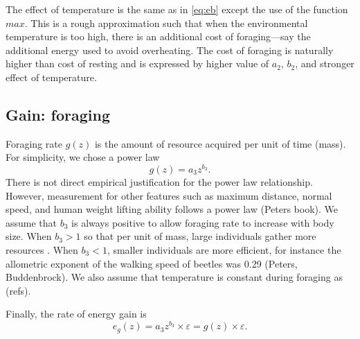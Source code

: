 The effect of temperature is the same as in \cref{eq:eb} except the use of the function $max$.
This is a rough approximation such that when the environmental temperature is too high, there is an additional cost of foraging---say the additional energy used to avoid overheating. 
The cost of foraging is naturally higher than cost of resting and is expressed by higher value of $a_2$, $b_2$, and stronger effect of temperature.

\subsection*{Gain: foraging}
Foraging rate $g(z)$ is the amount of resource acquired per unit of time (mass).
For simplicity, we chose a power law 
\[
	g(z) = a_3 z^{b_3}.
\] 
There is not direct empirical justification for the power law relationship.
However, measurement for other features such as maximum distance, normal speed, and human weight lifting ability follows a power law (Peters book). 
We assume that $b_3$ is always positive to allow foraging rate to increase with body size.
When $b_3 > 1$ so that per unit of mass, large individuals gather more resources \citep[e.g.,][]{Nervo2014}.
When $b_3 < 1$, smaller individuals are more efficient, for instance the allometric exponent of the walking speed of beetles was 0.29 (Peters, Buddenbrock). 
We also assume that temperature is constant during foraging as (refs).

Finally, the rate of energy gain is  
\begin{equation} \label{eq:eg}
	e_g(z) = a_3 z^{b_3} \times \varepsilon  = g(z) \times \varepsilon.
\end{equation}




